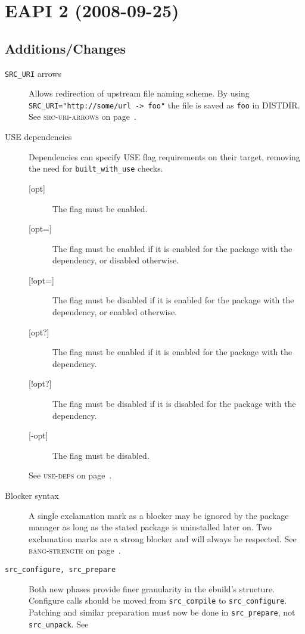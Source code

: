 \documentclass[a4paper]{leaflet}
\newcommand{\code}[1]{\texttt{#1}}
\newcommand{\featureref}[1]{\textsc{#1} on page~\pageref{feat:#1}}
\begin{document}
\section{EAPI 2 (2008-09-25)}
\label{sec:cs:eapi2}
\subsection{Additions/Changes}
\label{sec:cs:eapi2-additions}
\begin{description}
    \item[\code{SRC\_URI} arrows] Allows redirection of upstream file
    naming scheme.  By using
    \code{SRC\_URI="http:/\slash some\slash url -> foo"} the file is
    saved as \code{foo} in DISTDIR\@.
    See \featureref{src-uri-arrows}.
    \item[USE dependencies] Dependencies can specify USE flag
    requirements on their target, removing the need for
    \code{built\_with\_use} checks.
    \begin{description}
        \item[{[opt]}] The flag must be enabled.
        \item[{[opt=]}] The flag must be enabled if it is
        enabled for the package with the dependency, or disabled
        otherwise.
        \item[{[!opt=]}] The flag must be disabled if it is
        enabled for the package with the dependency, or enabled
        otherwise.
        \item[{[opt?]}] The flag must be enabled if it is
        enabled for the package with the dependency.
        \item[{[!opt?]}] The flag must be disabled if it is
        disabled for the package with the dependency.
        \item[{[-opt]}] The flag must be disabled.
    \end{description}
    See \featureref{use-deps}.
    \item[Blocker syntax] A single exclamation mark as a blocker may
    be ignored by the package manager as long as the stated package is
    uninstalled later on.  Two exclamation marks are a strong blocker
    and will always be respected.  See \featureref{bang-strength}.
    \item[\code{src\_configure, src\_prepare}] Both new phases provide
    finer granularity in the ebuild's structure.  Configure calls
    should be moved from \code{src\_compile} to \code{src\_configure}.
    Patching and similar preparation must now be done in
    \code{src\_prepare}, not \code{src\_unpack}.  See

\end{description}
\end{document}
